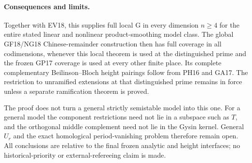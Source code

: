 \paragraph{Consequences and limits.}
Together with EV18, this supplies full local G in every
dimension $n\ge4$ for the entire stated linear and nonlinear
product-smoothing model class.  The global GF18/NG18
Chinese-remainder construction then has full coverage in all
codimensions, whenever this local theorem is used at the
distinguished prime and the frozen GP17 coverage is used at
every other finite place.  Its complete complementary
Beilinson--Bloch height pairings follow from PH16 and GA17.
The restriction to unramified extensions at that distinguished
prime remains in force unless a separate ramification theorem
is proved.

The proof does not turn a general strictly semistable model
into this one.  For a general model the component restrictions
need not lie in a subspace such as $T$, and the orthogonal
middle complement need not lie in the Gysin kernel.
General $U_r$ and the exact homological period-vanishing
problem therefore remain open.  All conclusions are relative
to the final frozen analytic and height interfaces; no
historical-priority or external-refereeing claim is made.

